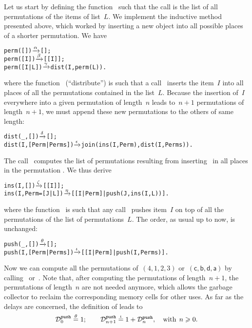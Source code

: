 Let us start by defining the function~ such that the
call  is the list of all permutations of the
items of list~\(L\). We implement the inductive method presented
above, which worked by inserting a new object into all possible places
of a shorter permutation. We have
\begin{alltt}
perm(   []) \(\smashedrightarrow{\alpha}\) [];
perm(  [I]) \(\smashedrightarrow{\beta}\) [[I]];
perm([I|L]) \(\smashedrightarrow{\gamma}\) dist(I,perm(L)).
\end{alltt}
where the function~ (``distribute'') is such that a
call~ inserts the item~\(I\) into all
places of all the permutations contained in the list~\(L\). Because
the insertion of~\(I\) everywhere into a given permutation of
length~\(n\) leads to~\(n+1\) permutations of length~\(n+1\), we must
append these new permutations to the others of same length:
\begin{alltt}
dist(_,          []) \(\smashedrightarrow{\delta}\) [];
dist(I,[Perm|Perms]) \(\smashedrightarrow{\epsilon}\) join(ins(I,Perm),dist(I,Perms)).
\end{alltt}
The call~ computes the list of permutations
resulting from inserting~ in all places in the permutation
. We thus derive
\begin{alltt}
ins(I,        []) \(\smashedrightarrow{\zeta}\) [[I]];
ins(I,Perm=[J|L]) \(\smashedrightarrow{\eta}\) [[I|Perm]|push(J,ins(I,L))].
\end{alltt}
where the function~ is such that any
call~ pushes item~\(I\) on top of all the
permutations of the list of permutations~\(L\). The order, as usual up
to now, is unchanged:\label{code:push}
\begin{alltt}
push(_,          []) \(\smashedrightarrow{\theta}\) [];
push(I,[Perm|Perms]) \(\smashedrightarrow{\iota}\) [[I|Perm]|push(I,Perms)].
\end{alltt}
Now we can compute all the permutations of~\((4,1,2,3)\)
or~\((\textsf{c},\textsf{b},\textsf{d},\textsf{a})\) by
calling~ or~. Note
that, after computing the permutations of length~\(n+1\), the
permutations of length~\(n\) are not needed anymore, which allows the
garbage collector to reclaim the corresponding memory cells for other
uses. As far as the delays are concerned, the definition
of  leads to
\[
\comp{push}{0} \eqn{\theta} 1;\qquad
\comp{push}{n+1} \eqn{\iota} 1 + \comp{push}{n},\quad \text{with}
                  \,\; n \geqslant 0.
\]
